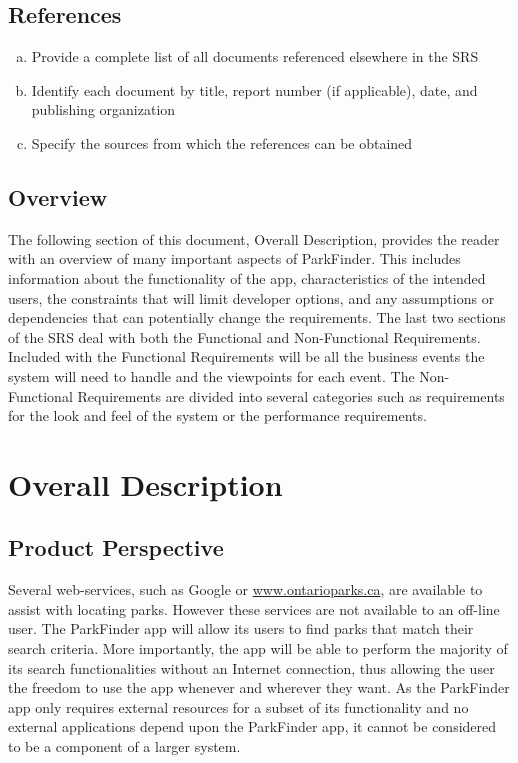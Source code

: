\documentclass[titlepage]{article}
\begin{document}

\subsection{References}%
\label{sub:references}
\color{red}
\begin{enumerate}[a)]
	\item Provide a complete list of all documents referenced elsewhere in the SRS
    \item Identify each document by title, report number (if applicable), date, and publishing
    organization
	\item Specify the sources from which the references can be obtained
\end{enumerate}
\color{black}

\subsection{Overview}%
\label{sub:overview}
The following section of this document, Overall Description, provides the reader with an overview of
many important aspects of ParkFinder. This includes information about the functionality of the app,
characteristics of the intended users, the constraints that will limit developer options, and any
assumptions or dependencies that can potentially change the requirements. The last two sections of
the SRS deal with both the Functional and Non-Functional Requirements. Included with the Functional
Requirements will be all the business events the system will need to handle and the viewpoints for
each event. The Non-Functional Requirements are divided into several categories such as requirements
for the look and feel of the system or the performance requirements.


\section{Overall Description}%
\label{sec:overall_description}

\subsection{Product Perspective}%
\label{sub:product_perspective}
Several web-services, such as Google or \url{www.ontarioparks.ca}, are available to assist with
locating parks. However these services are not available to an off-line user. The ParkFinder app
will allow its users to find parks that match their search criteria. More importantly, the app
will be able to perform the majority of its search functionalities without an Internet connection,
thus allowing the user the freedom to use the app whenever and wherever they want. As the ParkFinder
app only requires external resources for a subset of its functionality and no external applications
depend upon the ParkFinder app, it cannot be considered to be a component of a larger system.
\end{document}
